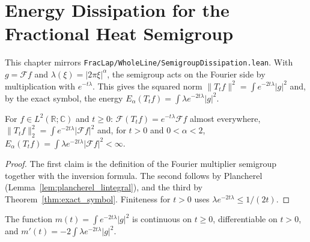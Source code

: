 \chapter{Energy Dissipation for the Fractional Heat Semigroup}

This chapter mirrors \texttt{FracLap/WholeLine/SemigroupDissipation.lean}. With $g = \mathcal{F} f$ and $\lambda(\xi) = \lvert 2\pi\xi\rvert^{\alpha}$, the semigroup acts on the Fourier side by multiplication with $e^{-t\lambda}$. This gives the squared norm $\lVert T_t f\rVert^2 = \int e^{-2t\lambda}\lvert g\rvert^2$ and, by the exact symbol, the energy $E_\alpha(T_t f) = \int \lambda e^{-2t\lambda}\lvert g\rvert^2$.

\begin{theorem}\label{thm:semigroup_fourier_side}
\leanok
For $f \in L^2(\mathbb{R}; \mathbb{C})$ and $t \ge 0$: $\mathcal{F}(T_t f) = e^{-t\lambda}\mathcal{F} f$ almost everywhere, $\lVert T_t f\rVert_2^2 = \int e^{-2t\lambda}\lvert\mathcal{F} f\rvert^2$ and, for $t > 0$ and $0 < \alpha < 2$, $E_\alpha(T_t f) = \int \lambda e^{-2t\lambda}\lvert\mathcal{F} f\rvert^2 < \infty$.
\end{theorem}

\begin{proof}
\leanok
The first claim is the definition of the Fourier multiplier semigroup together with the inversion formula. The second follows by Plancherel (Lemma~\ref{lem:plancherel_lintegral}), and the third by Theorem~\ref{thm:exact_symbol}. Finiteness for $t > 0$ uses $\lambda e^{-2t\lambda} \le 1/(2t)$.
\end{proof}

\begin{theorem}\label{thm:spectral_mass_derivative}
\leanok
The function $m(t) = \int e^{-2t\lambda}\lvert g\rvert^2$ is continuous on $t \ge 0$, differentiable on $t > 0$, and $m'(t) = -2\int \lambda e^{-2t\lambda}\lvert g\rvert^2$.
\end{theorem}

